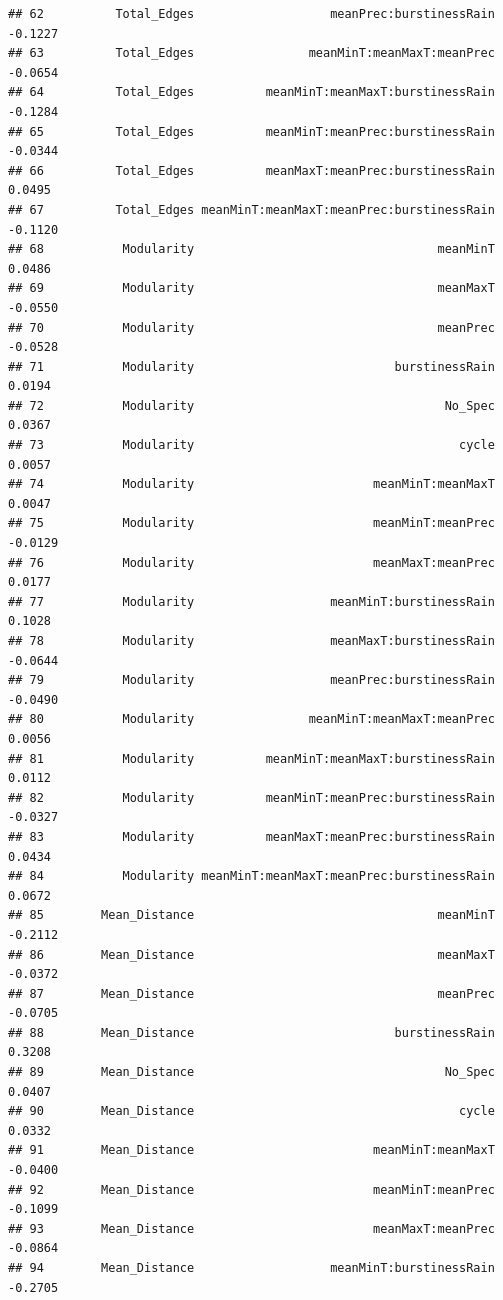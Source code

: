 \documentclass[
]{article}
\begin{document}
\begin{verbatim}
## 62          Total_Edges                   meanPrec:burstinessRain     -0.1227
## 63          Total_Edges                meanMinT:meanMaxT:meanPrec     -0.0654
## 64          Total_Edges          meanMinT:meanMaxT:burstinessRain     -0.1284
## 65          Total_Edges          meanMinT:meanPrec:burstinessRain     -0.0344
## 66          Total_Edges          meanMaxT:meanPrec:burstinessRain      0.0495
## 67          Total_Edges meanMinT:meanMaxT:meanPrec:burstinessRain     -0.1120
## 68           Modularity                                  meanMinT      0.0486
## 69           Modularity                                  meanMaxT     -0.0550
## 70           Modularity                                  meanPrec     -0.0528
## 71           Modularity                            burstinessRain      0.0194
## 72           Modularity                                   No_Spec      0.0367
## 73           Modularity                                     cycle      0.0057
## 74           Modularity                         meanMinT:meanMaxT      0.0047
## 75           Modularity                         meanMinT:meanPrec     -0.0129
## 76           Modularity                         meanMaxT:meanPrec      0.0177
## 77           Modularity                   meanMinT:burstinessRain      0.1028
## 78           Modularity                   meanMaxT:burstinessRain     -0.0644
## 79           Modularity                   meanPrec:burstinessRain     -0.0490
## 80           Modularity                meanMinT:meanMaxT:meanPrec      0.0056
## 81           Modularity          meanMinT:meanMaxT:burstinessRain      0.0112
## 82           Modularity          meanMinT:meanPrec:burstinessRain     -0.0327
## 83           Modularity          meanMaxT:meanPrec:burstinessRain      0.0434
## 84           Modularity meanMinT:meanMaxT:meanPrec:burstinessRain      0.0672
## 85        Mean_Distance                                  meanMinT     -0.2112
## 86        Mean_Distance                                  meanMaxT     -0.0372
## 87        Mean_Distance                                  meanPrec     -0.0705
## 88        Mean_Distance                            burstinessRain      0.3208
## 89        Mean_Distance                                   No_Spec      0.0407
## 90        Mean_Distance                                     cycle      0.0332
## 91        Mean_Distance                         meanMinT:meanMaxT     -0.0400
## 92        Mean_Distance                         meanMinT:meanPrec     -0.1099
## 93        Mean_Distance                         meanMaxT:meanPrec     -0.0864
## 94        Mean_Distance                   meanMinT:burstinessRain     -0.2705

\end{verbatim}
\end{document}
